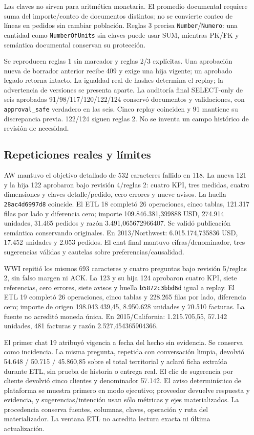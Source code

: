 \documentclass[11pt,letterpaper]{article}
\newcommand{\file}[1]{\texttt{#1}}
\begin{document}
Las claves no sirven para aritmética monetaria. El promedio documental requiere
suma del importe/conteo de documentos distintos; no se convierte conteo de líneas
en pedidos sin cambiar población. Reglas 3 precisa \file{Number}/\file{Numero}:
una cantidad como \file{NumberOfUnits} sin claves puede usar SUM, mientras PK/FK
y semántica documental conservan su protección.

Se reproducen reglas 1 sin marcador y reglas 2/3 explícitas. Una aprobación nueva
de borrador anterior recibe 409 y exige una hija vigente; un aprobado legado
retorna intacto. La igualdad real de hashes determina el replay; la advertencia
de versiones se presenta aparte. La auditoría final SELECT-only de seis aprobadas
91/98/117/120/122/124 conservó documentos y validaciones, con \file{approval\_safe}
verdadero en las seis. Cinco replay coinciden y 91 mantiene su discrepancia previa.
122/124 siguen reglas 2. No se inventa un campo histórico de revisión de necesidad.

\subsection{Repeticiones reales y límites}

AW mantuvo el objetivo detallado de 532 caracteres fallido en 118. La nueva 121 y
la hija 122 aprobaron bajo revisión 4/reglas 2: cuatro KPI, tres medidas, cuatro
dimensiones y claves detalle/pedido, cero errores y nueve avisos. La huella
\file{28ac4d6997d8} coincide. El ETL 18 completó 26 operaciones, cinco tablas,
121.317 filas por lado y diferencia cero; importe 109.846.381,399888 USD,
274.914 unidades, 31.465 pedidos y razón 3.491,065672966407. Se validó publicación
semántica conservando originales. En 2013/Northwest: 6.015.174,735836 USD,
17.452 unidades y 2.053 pedidos. El chat final mantuvo cifras/denominador, tres
sugerencias válidas y cautelas sobre preferencias/causalidad.

WWI repitió los mismos 693 caracteres y cuatro preguntas bajo revisión 5/reglas 2,
sin falso margen ni ACK. La 123 y su hija 124 aprobaron cuatro KPI, siete
referencias, cero errores, siete avisos y huella \file{b5872c3bbd6d} igual a replay.
El ETL 19 completó 26 operaciones, cinco tablas y 228.265 filas por lado, diferencia
cero; importe de origen 198.043.439,45, 8.950.628 unidades y 70.510 facturas.
La fuente no acreditó moneda única. En 2015/California: 1.215.705,55,
57.142 unidades, 481 facturas y razón 2.527,454365904366.

El primer chat 19 atribuyó vigencia a fecha del hecho sin evidencia. Se conserva
como incidencia. La misma pregunta, repetida con conversación limpia, devolvió
54.648 / 50.715 / 45.860,85 sobre el total territorial y aclaró ficha extraída
durante ETL, sin prueba de historia o entrega real. El clic de sugerencia por
cliente devolvió cinco clientes y denominador 57.142. El aviso determinístico de
plataforma se muestra primero en modo ejecutivo; proveedor devuelve respuesta y
evidencia, y sugerencias/intención usan sólo métricas y ejes materializados.
La procedencia conserva fuentes, columnas, claves, operación y ruta del
materializador. La ventana ETL no acredita lectura exacta ni última actualización.
\end{document}
